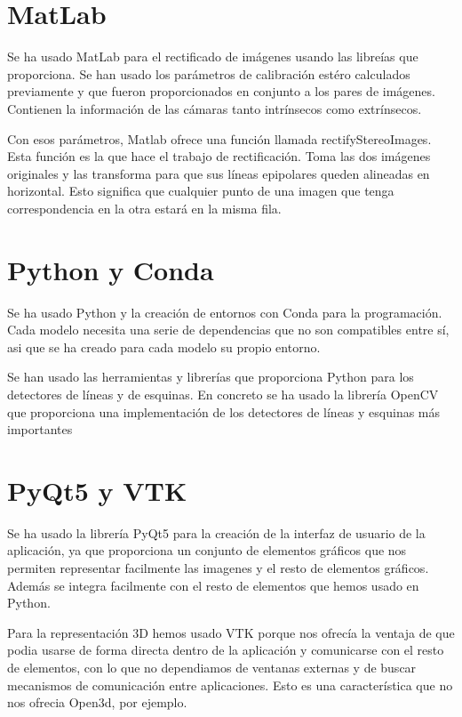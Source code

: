 
\section{MatLab}
Se ha usado MatLab para el rectificado de imágenes usando las libreías que proporciona. Se han usado los parámetros de calibración estéro calculados previamente y que fueron proporcionados en conjunto a los pares de imágenes. Contienen la información de las cámaras tanto intrínsecos como extrínsecos.

Con esos parámetros, Matlab ofrece una función llamada rectifyStereoImages. Esta función es la que hace el trabajo de rectificación. Toma las dos imágenes originales y las transforma para que sus líneas epipolares queden alineadas en horizontal. Esto significa que cualquier punto de una imagen que tenga correspondencia en la otra estará en la misma fila.

\section{Python y Conda}
Se ha usado Python y la creación de entornos con Conda para la programación. Cada modelo necesita una serie de dependencias que no son compatibles entre sí, asi que se ha creado para cada modelo su propio entorno.

Se han usado las herramientas y librerías que proporciona Python para los detectores de líneas y de esquinas. En concreto se ha usado la librería OpenCV que proporciona una implementación de los detectores de líneas y esquinas más importantes

\section{PyQt5 y VTK}
Se ha usado la librería PyQt5 para la creación de la interfaz de usuario de la aplicación, ya que proporciona un conjunto de elementos gráficos que nos permiten representar facilmente las imagenes y el resto de elementos gráficos. Además se integra facilmente con el resto de elementos que hemos usado en Python.

Para la representación 3D hemos usado VTK porque nos ofrecía la ventaja de que podia usarse de forma directa dentro de la aplicación y comunicarse con el resto de elementos, con lo que no dependiamos de ventanas externas y de buscar mecanismos de comunicación entre aplicaciones. Esto es una característica que no nos ofrecia Open3d, por ejemplo.



